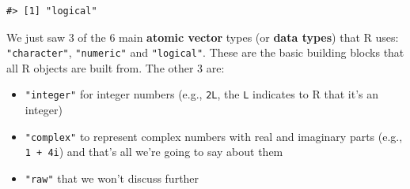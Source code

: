 \documentclass[
]{book}
\providecommand{\tightlist}{%
  \setlength{\itemsep}{0pt}\setlength{\parskip}{0pt}}
\begin{document}
\begin{verbatim}
#> [1] "logical"
\end{verbatim}

We just saw 3 of the 6 main \textbf{atomic vector} types (or \textbf{data types}) that R
uses: \texttt{"character"}, \texttt{"numeric"} and \texttt{"logical"}. These are the basic building blocks that all R objects are built from. The other 3 are:

\begin{itemize}
\tightlist
\item
  \texttt{"integer"} for integer numbers (e.g., \texttt{2L}, the \texttt{L} indicates to R that it's an integer)
\item
  \texttt{"complex"} to represent complex numbers with real and imaginary parts (e.g.,
  \texttt{1\ +\ 4i}) and that's all we're going to say about them
\item
  \texttt{"raw"} that we won't discuss further
\end{itemize}
\end{document}
